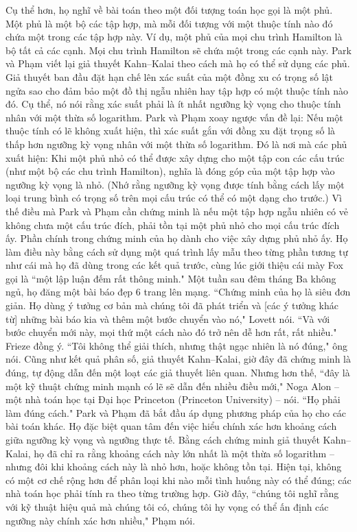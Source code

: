 \begin{multicols}{2}
\begin{figure}[H]
		\vspace*{-10pt}
	\end{figure}
	Cụ thể hơn, họ nghĩ về bài toán theo một đối tượng toán học gọi là một phủ. Một phủ là một bộ các tập hợp, mà mỗi đối tượng với một thuộc tính nào đó chứa một trong các tập hợp này. Ví dụ, một phủ của mọi chu trình Hamilton là bộ tất cả các cạnh. Mọi chu trình Hamilton sẽ chứa một trong các cạnh này.
	\vskip 0.1cm
	Park và Phạm viết lại giả thuyết Kahn--Kalai theo cách mà họ có thể sử dụng các phủ. Giả thuyết ban đầu đặt hạn chế lên xác suất của một đồng xu có trọng số lật ngửa sao cho đảm bảo một đồ thị ngẫu nhiên hay tập hợp có một thuộc tính nào đó. Cụ thể, nó nói rằng xác suất phải là ít nhất ngưỡng kỳ vọng cho thuộc tính nhân với một thừa số logarithm. Park và Phạm xoay ngược vấn đề lại: Nếu một thuộc tính có lẽ không xuất hiện, thì xác suất gắn với đồng xu đặt trọng số là thấp hơn ngưỡng kỳ vọng nhân với một thừa số logarithm.
	\vskip 0.1cm
	Đó là nơi mà các phủ xuất hiện: Khi một phủ nhỏ có thể được xây dựng cho một tập con các cấu trúc (như một bộ các chu trình Hamilton), nghĩa là đóng góp của một tập hợp vào ngưỡng kỳ vọng là nhỏ. (Nhớ rằng ngưỡng kỳ vọng được tính bằng cách lấy một loại trung bình có trọng số trên mọi cấu trúc có thể có một dạng cho trước.) Vì thế điều mà Park và Phạm cần chứng minh là nếu một tập hợp ngẫu nhiên có vẻ không chưa một cấu trúc đích, phải tồn tại một phủ nhỏ cho mọi cấu trúc đích ấy. Phần chính trong chứng minh của họ dành cho việc xây dựng phủ nhỏ ấy.
	\vskip 0.1cm
	Họ làm điều này bằng cách sử dụng một quá trình lấy mẫu theo từng phần tương tự như cái mà họ đã dùng trong các kết quả trước, cùng lúc giới thiệu cái mày Fox gọi là ``một lập luận đếm rất thông minh." Một tuần sau đêm tháng Ba không ngủ, họ đăng một bài báo đẹp $6$ trang lên mạng.
	\vskip 0.1cm
	``Chứng minh của họ là siêu đơn giản. Họ dùng ý tưởng cơ bản mà chúng tôi đã phát triển và [các ý tưởng khác từ] những bài báo kia và thêm một bước chuyển vào nó," Lovett nói. ``Và với bước chuyển mới này, mọi thứ một cách nào đó trở nên dễ hơn rất, rất nhiều."
	\vskip 0.1cm
	Frieze đồng ý. ``Tôi không thể giải thích, nhưng thật ngạc nhiên là nó đúng," ông nói.
	\vskip 0.1cm
	Cũng như kết quả phân số, giả thuyết Kahn--Kalai, giờ đây đã chứng minh là đúng, tự động dẫn đến một loạt các giả thuyết liên quan. Nhưng hơn thế, ``đây là một kỹ thuật chứng minh mạnh có lẽ sẽ dẫn đến nhiều điều mới,"  Noga Alon -- một nhà toán học tại Đại học Princeton (Princeton University) -- nói. ``Họ phải làm đúng cách."
	\vskip 0.1cm
	Park và Phạm đã bắt đầu áp dụng phương pháp của họ cho các bài toán khác. Họ đặc biệt quan tâm đến việc hiểu chính xác hơn khoảng cách giữa ngưỡng kỳ vọng và ngưỡng thực tế. Bằng cách chứng minh giả thuyết Kahn--Kalai, họ đã chỉ ra  rằng khoảng cách này lớn nhất là một thừa số logarithm -- nhưng đôi khi khoảng cách này là nhỏ hơn, hoặc không tồn tại. Hiện tại, không có một cơ chế rộng hơn để phân loại khi nào mỗi tình huống này có thể đúng; các nhà toán học phải tính ra theo từng trường hợp. Giờ đây, ``chúng tôi nghĩ rằng với kỹ thuật hiệu quả mà chúng tôi có, chúng tôi hy vọng có thể ấn định các ngưỡng này chính xác hơn nhiều," Phạm nói.

\end{multicols}
